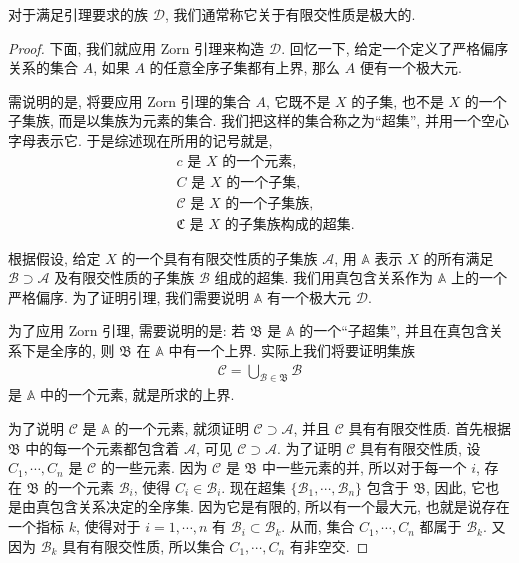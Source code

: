 \documentclass[../../main.tex]{subfiles}
\begin{document}
对于满足引理要求的族 $\mathcal{D}$, 我们通常称它关于有限交性质是极大的.

\begin{proof}
下面, 我们就应用 Zorn 引理来构造 $\mathcal{D}$. 回忆一下, 给定一个定义了严格偏序关系的集合 $A$, 如果 $A$ 的任意全序子集都有上界, 那么 $A$ 便有一个极大元.

需说明的是, 将要应用 Zorn 引理的集合 $A$, 它既不是 $X$ 的子集, 也不是 $X$ 的一个子集族, 而是以集族为元素的集合. 我们把这样的集合称之为``超集'', 并用一个空心字母表示它. 于是综述现在所用的记号就是,
\begin{align*}
&c \text{ 是 } X \text{ 的一个元素},\\
&C \text{ 是 } X \text{ 的一个子集},\\
&\mathcal{C} \text{ 是 } X \text{ 的一个子集族},\\
&\mathfrak{C} \text{ 是 } X \text{ 的子集族构成的超集}.
\end{align*}

根据假设, 给定 $X$ 的一个具有有限交性质的子集族 $\mathcal{A}$, 用 $\mathbb{A}$ 表示 $X$ 的所有满足 $\mathcal{B}\supset\mathcal{A}$ 及有限交性质的子集族 $\mathcal{B}$ 组成的超集. 我们用真包含关系作为 $\mathbb{A}$ 上的一个严格偏序. 为了证明引理, 我们需要说明 $\mathbb{A}$ 有一个极大元 $\mathcal{D}$.

为了应用 Zorn 引理, 需要说明的是: 若 $\mathfrak{B}$ 是 $\mathbb{A}$ 的一个``子超集'', 并且在真包含关系下是全序的, 则 $\mathfrak{B}$ 在 $\mathbb{A}$ 中有一个上界. 实际上我们将要证明集族
\begin{align*}
\mathcal{C}=\bigcup_{\mathcal{B}\in\mathfrak{B}}\mathcal{B}
\end{align*}
是 $\mathbb{A}$ 中的一个元素, 就是所求的上界.

为了说明 $\mathcal{C}$ 是 $\mathbb{A}$ 的一个元素, 就须证明 $\mathcal{C}\supset\mathcal{A}$, 并且 $\mathcal{C}$ 具有有限交性质. 首先根据 $\mathfrak{B}$ 中的每一个元素都包含着 $\mathcal{A}$, 可见 $\mathcal{C}\supset\mathcal{A}$. 为了证明 $\mathcal{C}$ 具有有限交性质, 设 $C_1,\cdots,C_n$ 是 $\mathcal{C}$ 的一些元素. 因为 $\mathcal{C}$ 是 $\mathfrak{B}$ 中一些元素的并, 所以对于每一个 $i$, 存在 $\mathfrak{B}$ 的一个元素 $\mathcal{B}_i$, 使得 $C_i\in\mathcal{B}_i$. 现在超集 $\{\mathcal{B}_1,\cdots,\mathcal{B}_n\}$ 包含于 $\mathfrak{B}$, 因此, 它也是由真包含关系决定的全序集. 因为它是有限的, 所以有一个最大元, 也就是说存在一个指标 $k$, 使得对于 $i=1,\cdots,n$ 有 $\mathcal{B}_i\subset\mathcal{B}_k$. 从而, 集合 $C_1,\cdots,C_n$ 都属于 $\mathcal{B}_k$. 又因为 $\mathcal{B}_k$ 具有有限交性质, 所以集合 $C_1,\cdots,C_n$ 有非空交.
\end{proof}
\end{document}
